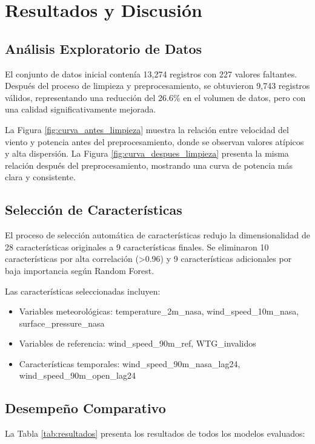 \documentclass[conference]{IEEEtran}
\begin{document}
	\section{Resultados y Discusión}
	
	\subsection{Análisis Exploratorio de Datos}
	El conjunto de datos inicial contenía 13,274 registros con 227 valores faltantes. Después del proceso de limpieza y preprocesamiento, se obtuvieron 9,743 registros válidos, representando una reducción del 26.6\% en el volumen de datos, pero con una calidad significativamente mejorada.
	
	La Figura \ref{fig:curva_antes_limpieza} muestra la relación entre velocidad del viento y potencia antes del preprocesamiento, donde se observan valores atípicos y alta dispersión. La Figura \ref{fig:curva_despues_limpieza} presenta la misma relación después del preprocesamiento, mostrando una curva de potencia más clara y consistente.
	
	\subsection{Selección de Características}
	El proceso de selección automática de características redujo la dimensionalidad de 28 características originales a 9 características finales. Se eliminaron 10 características por alta correlación (>0.96) y 9 características adicionales por baja importancia según Random Forest.
	
	Las características seleccionadas incluyen:
	\begin{itemize}
		\item Variables meteorológicas: temperature\_2m\_nasa, wind\_speed\_10m\_nasa, surface\_pressure\_nasa
		\item Variables de referencia: wind\_speed\_90m\_ref, WTG\_invalidos
		\item Características temporales: wind\_speed\_90m\_nasa\_lag24, wind\_speed\_90m\_open\_lag24
	\end{itemize}
	
	\subsection{Desempeño Comparativo}
	La Tabla \ref{tab:resultados} presenta los resultados de todos los modelos evaluados:
	
\end{document}
